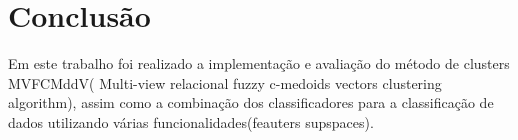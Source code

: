 \documentclass[12pt]{article}
\begin{document}
%
%
%
%
%
%


\section{Conclusão}

Em este trabalho foi realizado a implementação e avaliação do método de clusters MVFCMddV( Multi-view relacional fuzzy c-medoids vectors clustering algorithm), assim como a combinação dos classificadores para a classificação de dados utilizando várias funcionalidades(feauters supspaces). 




\end{document}

